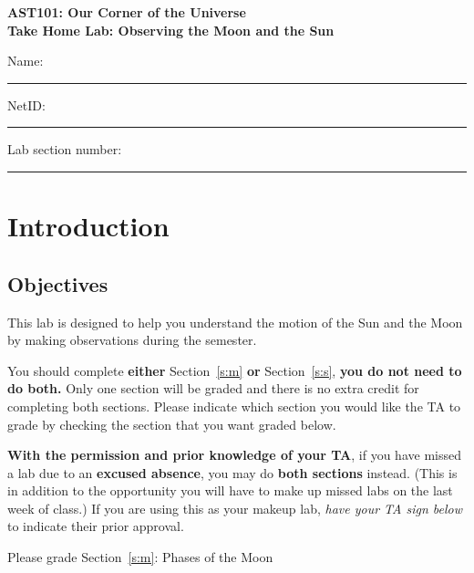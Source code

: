 \documentclass[11pt]{article}
\begin{document}
\begin{center}
\textbf{\Large
AST101: Our Corner of the Universe \\
\vspace*{0.1cm}
Take Home Lab: Observing the  Moon and the Sun
}
\end{center}

\vspace*{0.5cm}

{\Large Name:}\vspace*{0.5cm}\\\hrule
{\Large NetID:}\vspace*{0.5cm}\\\hrule
{\Large Lab section number:}\vspace*{0.5cm}\\\hrule
\vspace*{0.5cm}


\vspace*{-0.5cm}
\section{Introduction}

\subsection*{Objectives} 

This lab is designed to help you understand the motion of the Sun and the Moon
by making observations during the semester.

You should complete \textbf{either} Section~\ref{s:m} \textbf{or}
Section~\ref{s:s}, \textbf{you do not need to do both.} Only one section will
be graded and there is no extra credit for completing both sections. Please
indicate which section you would like the TA to grade by checking the section
that you want graded below.

{\bf With the permission and prior knowledge of your TA}, if you have missed
a lab due to an {\bf excused absence}, you may do {\bf both sections} instead.
(This is in addition to the opportunity you will have to make up missed labs
on the last week of class.) If you are using this as your makeup lab,
{\it have your TA sign below} to indicate their prior approval.

\vspace*{0.5cm}
\noindent
Please grade Section~\ref{s:m}: Phases of the Moon \hrulefill\hspace*{6cm}\\
\end{document}
